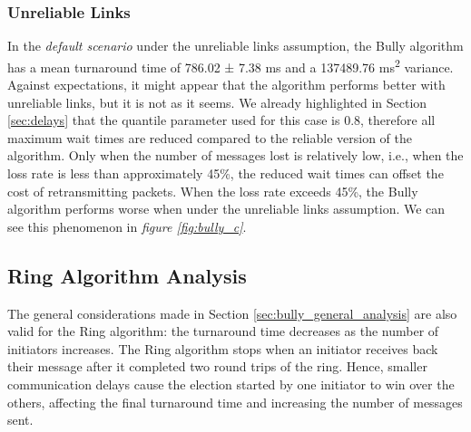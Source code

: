 \documentclass[10pt,journal,compsoc]{IEEEtran}
\begin{document}
\subsubsection{Unreliable Links}
\label{sec:bully_unreliable}
In the \textit{default scenario} under the unreliable links assumption, the
Bully algorithm has a mean turnaround time of 786.02 ± 7.38 ms and a 137489.76
ms\textsuperscript{2} variance. \\Against expectations, it might appear that the
algorithm performs better with unreliable links, but it is not as it seems. We
already highlighted in Section \ref{sec:delays} that the quantile parameter used
for this case is 0.8, therefore all maximum wait times are reduced compared to
the reliable version of the algorithm. 
Only when the number of messages lost is relatively low, i.e., when the loss
rate is less than approximately 45\%, the reduced wait times can offset the cost
of retransmitting packets. When the loss rate exceeds 45\%, the Bully algorithm
performs worse when under the unreliable links assumption. We can see this
phenomenon in \textit{figure \ref{fig:bully_c}}.
\subsection{Ring Algorithm Analysis}
The general considerations made in Section \ref{sec:bully_general_analysis} are
also valid for the Ring algorithm: the turnaround time decreases as the number
of initiators increases. The Ring algorithm stops when an initiator receives
back their message after it completed two round trips of the ring. Hence,
smaller communication delays cause the election started by one initiator to win
over the others, affecting the final turnaround time and increasing the number
of messages sent.
\end{document}

